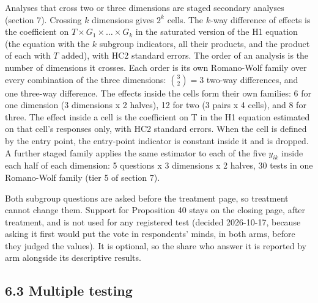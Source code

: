 Analyses that cross two or three dimensions are staged secondary analyses (section 7). Crossing \(k\)
dimensions gives \(2^k\) cells. The \(k\)-way difference of effects is the coefficient on
\(T \times G_1 \times \dots \times G_k\) in the saturated version of the H1 equation (the equation with the \(k\) subgroup
indicators, all their products, and the product of each with \(T\) added), with HC2 standard
errors. The order of an analysis is the number of dimensions it crosses. Each order is its own
Romano-Wolf family over every combination of the three dimensions: \(\binom{3}{2} = 3\) two-way differences, and
one three-way difference. The effects inside the cells form their own families: 6 for one
dimension (3 dimensions x 2 halves), 12 for two (3 pairs x 4 cells), and 8 for three. The effect
inside a cell is the coefficient on T in the H1 equation estimated on that cell's responses only,
with HC2 standard errors. When the cell is defined by the entry point, the entry-point indicator is
constant inside it and is dropped. A further staged family applies the same estimator to each of
the five \(y_{ik}\) inside each half of each dimension: 5 questions x 3 dimensions x 2 halves, 30
tests in one Romano-Wolf family (tier 5 of section 7).

Both subgroup questions are asked before the treatment page, so treatment cannot change them.
Support for Proposition 40 stays on the closing page, after treatment, and is not used for any
registered test (decided 2026-10-17, because asking it first would put the vote in respondents' minds, in both
arms, before they judged the values). It is optional, so
the share who answer it is reported by arm alongside its descriptive results.

\subsection{6.3 Multiple testing}\label{multiple-testing}


